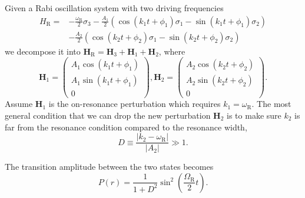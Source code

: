 \documentclass[%
reprint,
 amsmath,amssymb,
 prd,
]{revtex4-1}
\newcommand{\RD}{D}
\begin{document}
Given a Rabi oscillation system with two driving frequencies
\begin{align*}
    H_{\mathrm R} =& -\frac{\omega_{\mathrm R}}{2}\sigma_3 - \frac{A_{1} }{2}  \left( \cos(k_{1} t +\phi_{1})\sigma_1  - \sin(k_{1} t +\phi_{1}) \sigma_2\right) \nonumber\\
    & - \frac{A_{2} }{2}  \left( \cos(k_{2} t +\phi_{2})\sigma_1  - \sin(k_{2} t +\phi_{2}) \sigma_2\right)
\end{align*}
we decompose it into $\mathbf{H}_{\mathrm R}=\mathbf{H}_3 + \mathbf{H}_{1} + \mathbf{H}_2$, where
\begin{equation*}
    \mathbf{H}_1 =  \begin{pmatrix}
     A_{1} \cos(k_{1}t+\phi_{1}) \\
     A_{1} \sin(k_{1}t+\phi_{1})  \\
     0
      \end{pmatrix},   \mathbf{H}_2 =  \begin{pmatrix}
     A_{2} \cos(k_{2}t+\phi_{2}) \\
     A_{2} \sin(k_{2}t+\phi_{2})  \\
     0
      \end{pmatrix}.
\end{equation*}
Assume $\mathbf{H}_1$ is the on-resonance perturbation which requires $k_1 = \omega_{\mathrm{R}}$. The most general condition that we can drop the new perturbation $\mathbf{H}_2$ is to make sure $k_2$ is far from the resonance condition compared to the resonance width,
\begin{equation}
\RD \equiv \frac{\lvert k_2 -\omega_{\mathrm R}\rvert}{\lvert A_2\rvert} \gg 1.
\end{equation}

The transition amplitude between the two states becomes
\begin{equation}
P(r) = \frac{1}{1+\RD^2}\sin^2(\frac{\Omega_{\mathrm{R}}}{2}t).
\end{equation}





 



\end{document}
